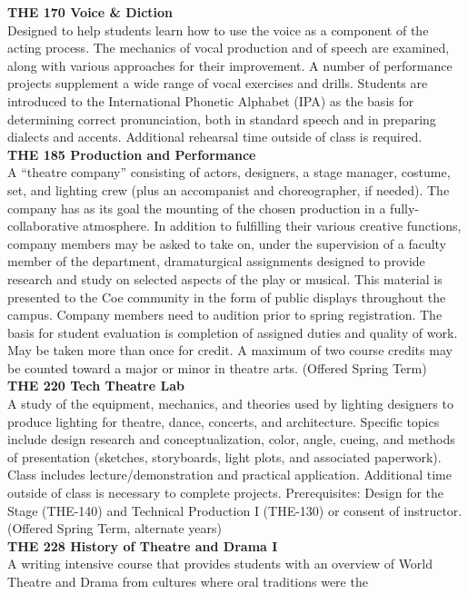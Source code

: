 \documentclass[
  letterpaper,
]{scrbook}
\begin{document}
\textbf{THE 170 Voice \& Diction}\\
Designed to help students learn how to use the voice as a component of
the acting process. The mechanics of vocal production and of speech are
examined, along with various approaches for their improvement. A number
of performance projects supplement a wide range of vocal exercises and
drills. Students are introduced to the International Phonetic Alphabet
(IPA) as the basis for determining correct pronunciation, both in
standard speech and in preparing dialects and accents. Additional
rehearsal time outside of class is required.\\
\textbf{THE 185 Production and Performance}\\
A ``theatre company'' consisting of actors, designers, a stage manager,
costume, set, and lighting crew (plus an accompanist and choreographer,
if needed). The company has as its goal the mounting of the chosen
production in a fully-collaborative atmosphere. In addition to
fulfilling their various creative functions, company members may be
asked to take on, under the supervision of a faculty member of the
department, dramaturgical assignments designed to provide research and
study on selected aspects of the play or musical. This material is
presented to the Coe community in the form of public displays throughout
the campus. Company members need to audition prior to spring
registration. The basis for student evaluation is completion of assigned
duties and quality of work. May be taken more than once for credit. A
maximum of two course credits may be counted toward a major or minor in
theatre arts. (Offered Spring Term)\\
\textbf{THE 220 Tech Theatre Lab}\\
A study of the equipment, mechanics, and theories used by lighting
designers to produce lighting for theatre, dance, concerts, and
architecture. Specific topics include design research and
conceptualization, color, angle, cueing, and methods of presentation
(sketches, storyboards, light plots, and associated paperwork). Class
includes lecture/demonstration and practical application. Additional
time outside of class is necessary to complete projects. Prerequisites:
Design for the Stage (THE-140) and Technical Production I (THE-130) or
consent of instructor. (Offered Spring Term, alternate years)\\
\textbf{THE 228 History of Theatre and Drama I}\\
A writing intensive course that provides students with an overview of
World Theatre and Drama from cultures where oral traditions were the
\end{document}
